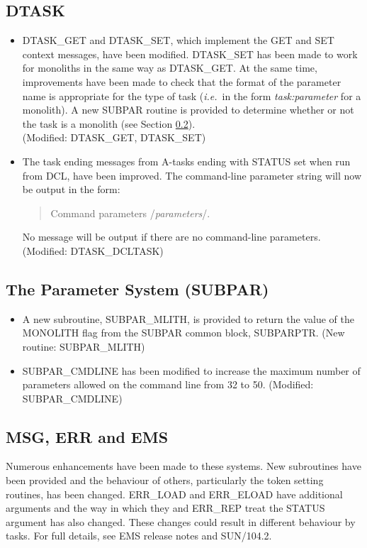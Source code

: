 \subsection{DTASK}
\label{dtask}
\begin{itemize}
\item DTASK\_GET and DTASK\_SET, which implement the GET and SET context 
messages, have been modified.
DTASK\_SET has been made to work for monoliths in the same way as DTASK\_GET.
At the same time, improvements have been made to check that the format of
the parameter name is appropriate for the type of task ({\em i.e.}\ in the form 
{\em task:parameter} for a monolith).
A new SUBPAR routine is provided to determine whether or not the task is a
monolith (see Section \ref{subpar}).\\
(Modified: DTASK\_GET, DTASK\_SET)
\item The task ending messages from A-tasks ending with STATUS set when run 
from DCL, have been improved.
The command-line parameter string will now be output in the form:
\begin{quote}
Command parameters /{\em parameters}\//.
\end{quote}
No message will be output if there are no command-line parameters.\\
(Modified: DTASK\_DCLTASK)
\end{itemize}

\subsection{The Parameter System (SUBPAR)}
\label{subpar}
\begin{itemize}
\item A new subroutine, SUBPAR\_MLITH, is provided to return the value of the 
MONOLITH flag from the SUBPAR common block, SUBPARPTR.
(New routine: SUBPAR\_MLITH)
\item SUBPAR\_CMDLINE has been modified to increase the maximum number of 
parameters allowed on the command line from 32 to 50.
(Modified: SUBPAR\_CMDLINE)
\end{itemize}

\subsection{MSG, ERR and EMS}
Numerous enhancements have been made to these systems.
New subroutines have been provided and the behaviour of others, particularly
the token setting routines, has been changed.
ERR\_LOAD and ERR\_ELOAD have additional arguments and
the way in which they and ERR\_REP treat the STATUS argument has also changed.
These changes could result in different behaviour by tasks.
For full details, see EMS release notes and SUN/104.2.

